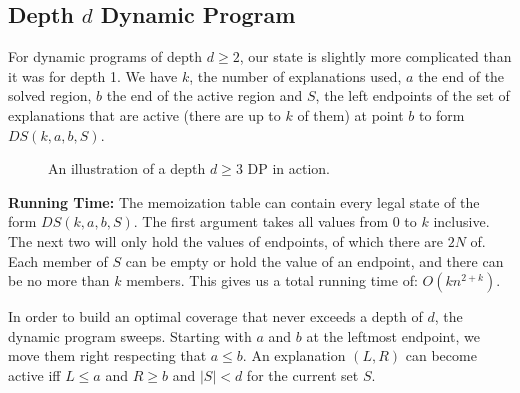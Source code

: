 \subsection{Depth $d$ Dynamic Program} \label{sec:dpFixedDepth}

For dynamic programs of depth $d \geq 2$, our state is slightly more complicated than it was for depth 1. We have $k$, the number of explanations used, $a$ the end of the solved region, $b$ the end of the active region and $S$, the left endpoints of the set of explanations that are active (there are up to $k$ of them) at point $b$ to form $DS(k,a,b,S)$.


\begin{figure}[ht!] \centering
{} 
\caption{An illustration of a depth $d \geq 3$ DP in action.}
\label{fig:dpIllustration}
\end{figure}

\FloatBarrier

{\bf Running Time:} The memoization table can contain every legal state of the form $DS(k,a,b,S)$.  The first argument takes all values from 0 to $k$ inclusive.  The next two will only hold the values of endpoints, of which there are $2N$ of.  Each member of $S$ can be empty or hold the value of an endpoint, and there can be no more than $k$ members.  This gives us a total running time of: $O(kn^{2+k})$.

In order to build an optimal coverage that never exceeds a depth of $d$, the dynamic program sweeps.  Starting with $a$ and $b$ at the leftmost endpoint, we move them right respecting that $a \leq b$.  An explanation $(L,R)$ can become active iff $L\leq a$ and $R \geq b$ and $|S|<d$ for the current set $S$.

